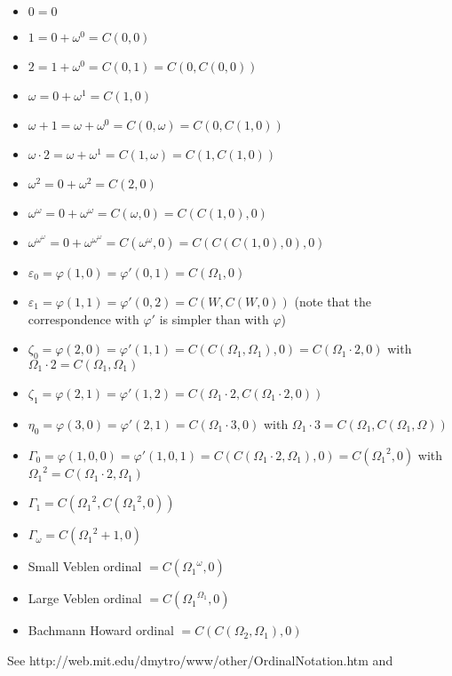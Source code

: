 \documentclass[10pt]{article}
\begin{document}
\begin{itemize}
\item \( 0 = 0 \)
\item \( 1 = 0+\omega^0 = C(0,0) \)
\item \( 2 = 1+\omega^0 = C(0,1) = C(0,C(0,0)) \)
\item \( \omega = 0+\omega^1 = C(1,0) \)
\item \( \omega+1 = \omega+\omega^0 = C(0,\omega) = C(0,C(1,0)) \)
\item \( \omega \cdot 2 =\omega+\omega^1 = C(1,\omega) = C(1,C(1,0)) \)
\item \( \omega^2 = 0+\omega^2 = C(2,0) \)
\item \( \omega^\omega = 0+\omega^\omega = C(\omega,0) = C(C(1,0),0) \)
\item \( \omega^{\omega^\omega} = 0+\omega^{\omega^\omega} = C(\omega^\omega,0) = C(C(C(1,0),0),0) \)
\item \( \varepsilon_0 = \varphi(1,0) = \varphi'(0,1) = C(\Omega_1,0) \)
\item \( \varepsilon_1 = \varphi(1,1) = \varphi'(0,2) = C(W,C(W,0)) \) (note that the correspondence with \( \varphi' \) is simpler than with \( \varphi \))
\item \( \zeta_0 = \varphi(2,0) = \varphi'(1,1) = C(C(\Omega_1,\Omega_1),0) = C(\Omega_1 \cdot 2,0) \) with \( \Omega_1 \cdot 2 = C(\Omega_1,\Omega_1)
 \)
\item \( \zeta_1 = \varphi(2,1) = \varphi'(1,2) = C(\Omega_1 \cdot 2,C(\Omega_1 \cdot 2,0)) \)
\item \( \eta_0 = \varphi(3,0) = \varphi'(2,1) = C(\Omega_1 \cdot 3,0) \) with \( \Omega_1 \cdot 3 = C(\Omega_1,C(\Omega_1,\Omega)) \)
\item \( \Gamma_0 = \varphi(1,0,0) = \varphi'(1,0,1) = C(C(\Omega_1 \cdot 2,\Omega_1),0) = C({\Omega_1}^2,0) \) with \( {\Omega_1}^2 = C(\Omega_1 \cdot 2,\Omega_1) \)
\item \( \Gamma_1 = C({\Omega_1}^2,C({\Omega_1}^2,0)) \)
\item \( \Gamma_\omega = C({\Omega_1}^2+1,0) \)
\item Small Veblen ordinal \( = C({\Omega_1}^\omega,0) \)
\item Large Veblen ordinal \( = C({\Omega_1}^{\Omega_1},0) \)
\item Bachmann Howard ordinal \( = C(C(\Omega_2,\Omega_1),0) \)
\end{itemize}

See http://web.mit.edu/dmytro/www/other/OrdinalNotation.htm and 
\end{document}
